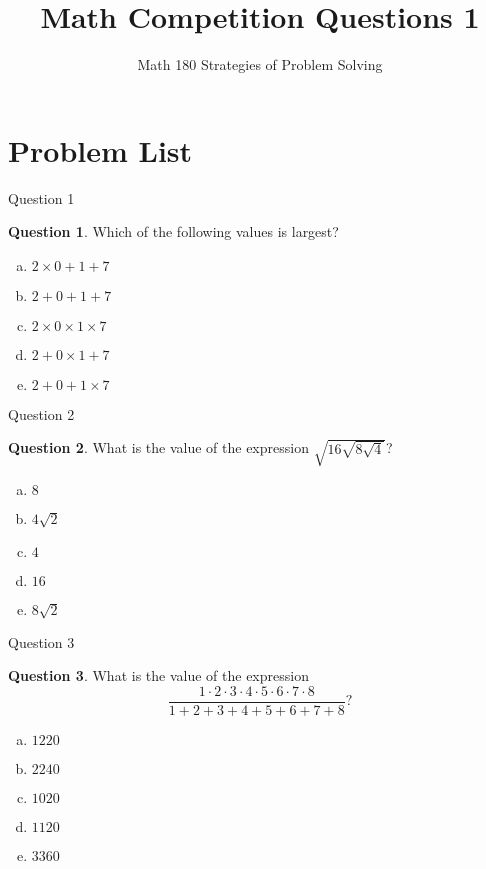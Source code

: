 \documentclass[handout]{beamer}
\title{Math Competition Questions 1}
\subtitle
{Math 180 Strategies of Problem Solving}
\author[W.R. Casper] %
{}%
\institute[California State University Fullerton] %
{
  Department of Mathematics\\
  California State University Fullerton}
\theoremstyle{definition}
\newtheorem{quest}{Question}
\begin{document}
\begin{frame}
  \titlepage
\end{frame}





\section{Problem List}
\begin{frame}{Question 1}
\begin{quest}
Which of the following values is largest?
\begin{enumerate}[(a)]
\item $2\times 0  + 1 + 7$
\item $2 + 0 + 1 + 7$
\item $2\times 0\times 1\times 7$
\item $2+0\times1+7$
\item $2+0+1\times 7$
\end{enumerate}
\end{quest}
\end{frame}

\begin{frame}{Question 2}
\begin{quest}
What is the value of the expression $\sqrt{16\sqrt{8\sqrt{4}}}$?
\begin{enumerate}[(a)]
\item $8$
\item $4\sqrt{2}$
\item $4$
\item $16$
\item $8\sqrt{2}$
\end{enumerate}
\end{quest}
\end{frame}

\begin{frame}{Question 3}
\begin{quest}
What is the value of the expression
$$\frac{1\cdot 2\cdot 3\cdot 4\cdot 5\cdot6\cdot7\cdot8}{1+2+3+4+5+6+7+8}?$$
\begin{enumerate}[(a)]
\item $1220$
\item $2240$
\item $1020$
\item $1120$
\item $3360$
\end{enumerate}
\end{quest}

\end{frame}
\end{document}
